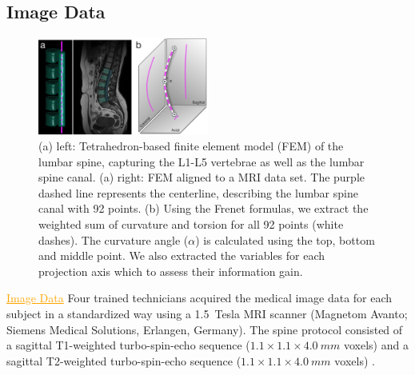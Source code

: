 \documentclass[a4paper,twoside]{style/article}
\newcommand{\com}[1]{\textcolor{orange}{\uline{#1}}}
\begin{document}
\subsection{Image Data}
\begin{figure}[!h]
  \centering
  \includegraphics[width=0.5\textwidth]{figures/centerline}
  \caption{
	(a) left: Tetrahedron-based finite element model (FEM) of the lumbar spine, capturing the L1-L5 vertebrae as well as the lumbar spine canal.
	(a) right: FEM aligned to a MRI data set.
	The purple dashed line represents the centerline, describing the lumbar spine canal with 92 points.
	(b) Using the Frenet formulas, we extract the weighted sum of curvature and torsion for all 92 points (white dashes).
	The curvature angle ($\alpha$) is calculated using the top, bottom and middle point.
	We also extracted the variables for each projection axis which to assess their information gain.
	}
  \label{fig:centerline}
\end{figure}
\com{Image Data}
Four trained technicians acquired the medical image data for each subject in a standardized way using a 1.5~Tesla MRI scanner (Magnetom Avanto; Siemens Medical Solutions, Erlangen, Germany).
The spine protocol consisted of a sagittal T1-weighted turbo-spin-echo sequence ($1.1\times1.1\times4.0~mm$ voxels) and a sagittal T2-weighted turbo-spin-echo sequence ($1.1\times1.1\times4.0~mm$ voxels) \cite{Hegenscheid2013}.
\end{document}
